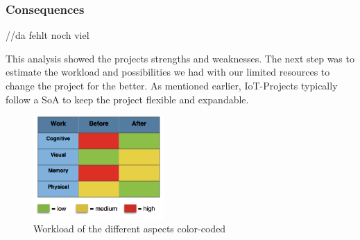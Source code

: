 \subsubsection{Consequences}
//da fehlt noch viel

This analysis showed the projects strengths and weaknesses. The next step was to estimate the workload and possibilities 
we had with our limited resources to change the project for the better. 
As mentioned earlier, IoT-Projects typically follow a SoA %
to keep the project flexible and expandable. 

\begin{figure}[th]
    \centering
    \includegraphics[width=50mm,scale=.5]{Figures/workload}
    \decoRule
    \caption[workload]{Workload of the different aspects color-coded}
    \label{fig:workload}
\end{figure}
